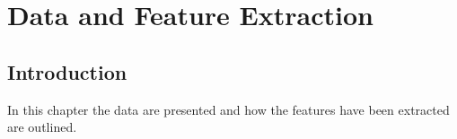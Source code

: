 \chapter{Data and Feature Extraction}

\section{Introduction}
In this chapter the data are presented and how the features have been extracted are outlined.


